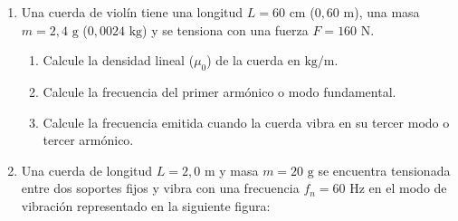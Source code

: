 \documentclass[11pt, letterpaper]{article}
\newif\ifshowanswers
\newcommand{\answer}[1]{%
	\ifshowanswers
	\par\vspace{0.15cm}
	\begin{tcolorbox}[colback=blue!5!white, colframe=blue!60!white, arc=1mm, boxrule=0.5pt, title=\textbf{\footnotesize SOLUCIÓN PASO A PASO (DOCENTE)}]
		\color{blue!80!black}\footnotesize #1
	\end{tcolorbox}
	\par\vspace{0.15cm}
	\else
	\par\vspace{0.3cm}
	\fi
}
\begin{document}
\begin{enumerate}[leftmargin=*, itemsep=0.8cm]
		
		\item  Una cuerda de violín tiene una longitud $L = 60\text{ cm}$ ($0,60\text{ m}$), una masa $m = 2,4\text{ g}$ ($0,0024\text{ kg}$) y se tensiona con una fuerza $F = 160\text{ N}$.
		\begin{enumerate}[label=\alph*), itemsep=0.2cm]
			\item Calcule la densidad lineal ($\mu_0$) de la cuerda en $\text{kg/m}$.
			\item Calcule la frecuencia del primer armónico o modo fundamental.
			\item Calcule la frecuencia emitida cuando la cuerda vibra en su tercer modo o tercer armónico.
		\end{enumerate}
		\answer{
			\textbf{a) Masa por unidad de longitud ($\mu_0$) con la ecuación (V):}
			\[ \mu_0 = \frac{m}{L} = \frac{0,0024\text{ kg}}{0,60\text{ m}} = \mathbf{0,004\text{ kg/m}} \]
			\textbf{b) Frecuencia del $1^{\text{er}}$ modo o primer armónico ($n = 1$) con la ecuación (IV):}
			\[ f_1 = \frac{1}{2L} \cdot \sqrt{\frac{F}{\mu_0}} = \frac{1}{2 \cdot (0,60\text{ m})} \cdot \sqrt{\frac{160\text{ N}}{0,004\text{ kg/m}}} = \frac{1}{1,20} \cdot \sqrt{40000} = \frac{200}{1,20} \approx \mathbf{166,67\text{ Hz}} \]
			\textbf{c) Frecuencia del $3^{\text{er}}$ modo o tercer armónico ($n = 3$) con la ecuación (IV):}
			\[ f_3 = \frac{3}{2L} \cdot \sqrt{\frac{F}{\mu_0}} = \frac{3}{2 \cdot (0,60\text{ m})} \cdot \sqrt{\frac{160\text{ N}}{0,004\text{ kg/m}}} = \frac{3}{1,20} \cdot 200 = \frac{600}{1,20} = \mathbf{500,0\text{ Hz}} \]
		}
		
		\item  Una cuerda de longitud $L = 2,0\text{ m}$ y masa $m = 20\text{ g}$ se encuentra tensionada entre dos soportes fijos y vibra con una frecuencia $f_n = 60\text{ Hz}$ en el modo de vibración representado en la siguiente figura:
		

\end{enumerate}
\end{document}
